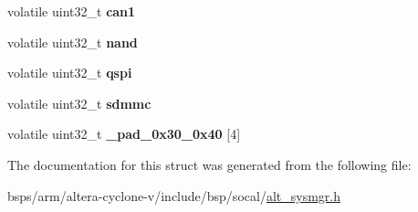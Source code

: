 \begin{DoxyCompactItemize}
\item 
\mbox{\label{structALT__SYSMGR__ECC__raw__s_a3e9e51d4ec18fa3c3587cea331bca31a}} 
volatile uint32\+\_\+t {\bfseries can1}
\item 
\mbox{\label{structALT__SYSMGR__ECC__raw__s_a3a2ae6b439086efdd11188ac16b4061c}} 
volatile uint32\+\_\+t {\bfseries nand}
\item 
\mbox{\label{structALT__SYSMGR__ECC__raw__s_a007125dabbb3f1ed4eca36f251bf27e7}} 
volatile uint32\+\_\+t {\bfseries qspi}
\item 
\mbox{\label{structALT__SYSMGR__ECC__raw__s_a1d1137b4972684bfaf0a01de2c0f6005}} 
volatile uint32\+\_\+t {\bfseries sdmmc}
\item 
\mbox{\label{structALT__SYSMGR__ECC__raw__s_a35e6b28cd3ce76e2918515f011c9d52b}} 
volatile uint32\+\_\+t {\bfseries \+\_\+pad\+\_\+0x30\+\_\+0x40} \mbox{[}4\mbox{]}
\end{DoxyCompactItemize}


The documentation for this struct was generated from the following file\+:\begin{DoxyCompactItemize}
\item 
bsps/arm/altera-\/cyclone-\/v/include/bsp/socal/\mbox{\hyperlink{alt__sysmgr_8h}{alt\+\_\+sysmgr.\+h}}\end{DoxyCompactItemize}
